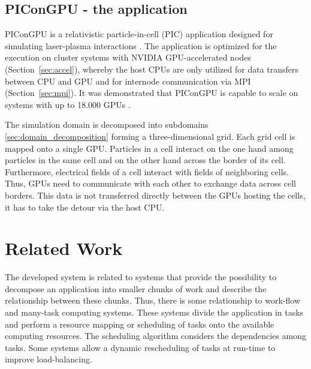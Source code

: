 \subsection{PIConGPU - the application}
\label{sec:picongpu}
PIConGPU is a relativistic particle-in-cell (PIC) application designed
for simulating laser-plasma interactions \cite{ref:picongpu}.  The
application is optimized for the execution on cluster systems with
NVIDIA GPU-accelerated nodes (Section~\ref{sec:accel}), whereby the
host CPUs are only utilized for data transfers between CPU and GPU and
for internode communication via MPI (Section~\ref{sec:mpi}). It was
demonstrated that PIConGPU is capable to scale on systems with up to
18.000 GPUs \cite{ref:picongpu_scale}.

The simulation domain is decomposed into subdomains
\ref{sec:domain_decomposition} forming a three-dimensional grid. Each
grid cell is mapped onto a single GPU. Particles in a cell interact on
the one hand among particles in the same cell and on the other hand
across the border of its cell. Furthermore, electrical fields of a
cell interact with fields of neighboring cells. Thus, GPUs need to
communicate with each other to exchange data across cell
borders. This data is not transferred directly between the GPUs
hosting the cells, it has to take the detour via the host CPU.

\section{Related Work}
\label{sec:related_work}
The developed system is related to systems that provide the possibility to
decompose an application into smaller chunks of work and describe the
relationship between these chunks.  Thus, there is some relationship
to work-flow and many-task computing systems. These systems divide the
application in tasks and perform a resource mapping or scheduling of
tasks onto the available computing resources. The scheduling algorithm
considers the dependencies among tasks. Some systems allow a dynamic
rescheduling of tasks at run-time to improve load-balancing.

